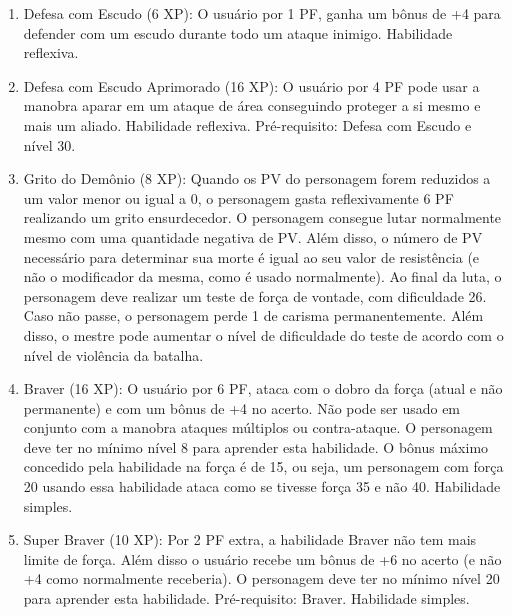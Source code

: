 \begin{enumerate}
	\item Defesa com Escudo (6 XP): O usuário por 1 PF, ganha um bônus de +4 para defender com um escudo durante todo um ataque inimigo. Habilidade reflexiva.
	
	\item Defesa com Escudo Aprimorado (16 XP): O usuário por 4 PF pode usar a manobra aparar em um ataque de área conseguindo proteger a si mesmo e mais um aliado. Habilidade reflexiva. Pré-requisito: Defesa com Escudo e nível 30.
	

\item Grito do Demônio (8 XP): Quando os PV do personagem forem reduzidos a um valor menor ou igual a 0, o personagem gasta reflexivamente 6 PF realizando um grito ensurdecedor. O personagem consegue lutar normalmente mesmo com uma quantidade negativa de PV. Além disso, o número de PV necessário para determinar sua morte é igual ao seu valor de resistência (e não o modificador da mesma, como é usado normalmente). Ao final da luta, o personagem deve realizar um teste de força de vontade, com dificuldade 26. Caso não passe, o personagem perde 1 de carisma permanentemente. Além disso, o mestre pode aumentar o nível de dificuldade do teste de acordo com o nível de violência da batalha.


	\item Braver (16 XP): O usuário por 6 PF, ataca com o dobro da força (atual e não permanente) e com um bônus de +4 no acerto. Não pode ser usado em conjunto com a manobra ataques múltiplos ou contra-ataque. O personagem deve ter no mínimo nível 8 para aprender esta habilidade. O bônus máximo concedido pela habilidade na força é de 15, ou seja, um personagem com força 20 usando essa habilidade ataca como se tivesse força 35 e não 40. Habilidade simples.

	\item Super Braver (10 XP): Por 2 PF extra, a habilidade Braver não tem mais limite de força. Além disso o usuário recebe um bônus de +6 no acerto (e não +4 como normalmente receberia). O personagem deve ter no mínimo nível 20 para aprender esta habilidade. Pré-requisito: Braver. Habilidade simples.


\end{enumerate}
